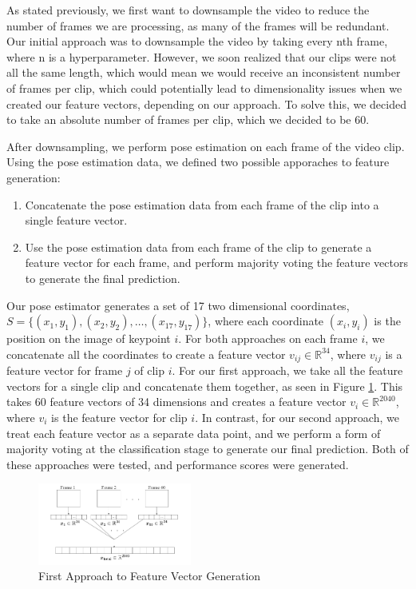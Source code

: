 \documentclass[10pt,twocolumn,letterpaper]{article}
\begin{document}
As stated previously, we first want to downsample the video to reduce the number
of frames we are processing, as many of the frames will be redundant. Our initial approach was to
downsample the video by taking every nth frame, where n is a hyperparameter. However, we soon realized
that our clips were not all the same length, which would mean we would receive an inconsistent number of
frames per clip, which could potentially lead to dimensionality issues when we created our feature vectors, depending on our approach.
To solve this, we decided to take an absolute number of frames per clip, which we decided to be 60.

After downsampling, we perform pose estimation on each frame of the video clip. Using the pose estimation data, we defined two possible apporaches
to feature generation:
\begin{enumerate}
  \item Concatenate the pose estimation data from each frame of the clip into a single feature vector.
  \item Use the pose estimation data from each frame of the clip to generate a feature vector for each frame, and perform majority voting the feature vectors to generate the final prediction.
\end{enumerate}

Our pose estimator generates a set of 17 two dimensional coordinates, $S=\{(x_1, y_1), (x_2, y_2), \dots, (x_{17}, y_{17})\}$, where each coordinate $(x_i, y_i)$ is the
position on the image of keypoint $i$. For both approaches on each frame $i$, we concatenate all the coordinates to create a feature vector $v_{ij} \in \mathbb{R}^{34}$, where $v_{ij}$ is
a feature vector for frame $j$ of clip $i$. For our first approach, we take all the feature vectors for a single clip and concatenate them together, as seen in Figure \ref{fig:feature_vector}.
This takes 60 feature vectors of 34 dimensions and creates a feature vector $v_i \in \mathbb{R}^{2040}$, where $v_i$ is the feature vector for clip $i$. In contrast, for our second approach, we treat
each feature vector as a separate data point, and we perform a form of majority voting at the classification stage to generate our final prediction. Both of these approaches were tested, and performance
scores were generated.

\begin{figure}
  \centering
  \includegraphics[width=0.45\textwidth, height=0.27\textwidth]{imgs/concat_vectors.png}
  \caption{First Approach to Feature Vector Generation}
  \label{fig:feature_vector}
\end{figure}
\end{document}
